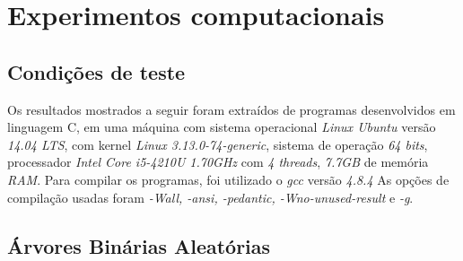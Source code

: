 \documentclass[a4paper,12pt]{article}
\begin{document}









\section {Experimentos computacionais}
	
	\subsection{Condições de teste}
	Os resultados mostrados a seguir foram extraídos de programas
	desenvolvidos em linguagem C,
	em uma máquina com sistema operacional
	\textit{Linux Ubuntu} versão \textit{14.04 LTS}, 
	com kernel \textit{Linux 3.13.0-74-generic}, 
	sistema de operação \textit{64 bits}, 
	processador \textit{Intel Core i5-4210U 1.70GHz} com \textit{4 threads},
	\textit{7.7GB} de memória \textit{RAM}. 
	Para compilar os programas, foi utilizado 
	o \textit{gcc} versão \textit{4.8.4}
	As opções de compilação usadas foram \textit{-Wall, -ansi, -pedantic, 
	-Wno-unused-result} e \textit{-g}. 

	\subsection{Árvores Binárias Aleatórias}
\end{document}
